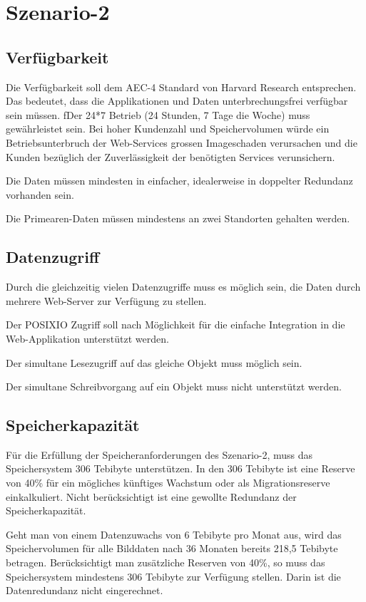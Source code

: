 \section{Szenario-2}\label{Szenario-2}

\subsection{Verfügbarkeit}
Die Verfügbarkeit soll dem AEC-4 Standard von Harvard Research entsprechen. Das bedeutet, dass die Applikationen und Daten unterbrechungsfrei verfügbar sein müssen. ƒDer 24*7 Betrieb (24 Stunden, 7 Tage die Woche) muss gewährleistet sein. Bei hoher Kundenzahl und Speichervolumen würde ein Betriebsunterbruch der Web-Services grossen Imageschaden verursachen und die Kunden bezüglich der Zuverlässigkeit der benötigten Services verunsichern.

Die Daten müssen mindesten in einfacher, idealerweise in doppelter Redundanz vorhanden sein. 

Die \gls{Primearen-Daten} müssen mindestens an zwei Standorten gehalten werden.

\subsection{Datenzugriff}
Durch die gleichzeitig vielen Datenzugriffe muss es möglich sein, die Daten durch mehrere Web-Server zur Verfügung zu stellen.

Der \gls{POSIXIO} Zugriff soll nach Möglichkeit für die einfache Integration in die Web-Applikation unterstützt werden.

Der simultane Lesezugriff auf das gleiche Objekt muss möglich sein.

Der simultane Schreibvorgang auf ein Objekt muss nicht unterstützt werden.

\subsection{Speicherkapazität}
Für die Erfüllung der Speicheranforderungen des Szenario-2, muss das Speichersystem 306 Tebibyte unterstützen. In den 306 Tebibyte ist eine Reserve von 40\% für ein mögliches künftiges Wachstum oder als Migrationsreserve einkalkuliert. Nicht berücksichtigt ist eine gewollte Redundanz der Speicherkapazität.

Geht man von einem Datenzuwachs von 6 Tebibyte pro Monat aus, wird das Speichervolumen für alle Bilddaten nach 36 Monaten bereits 218,5 Tebibyte betragen. Berücksichtigt man zusätzliche Reserven von 40\%, so muss das Speichersystem mindestens 306 Tebibyte zur Verfügung stellen. Darin ist die Datenredundanz nicht eingerechnet.

